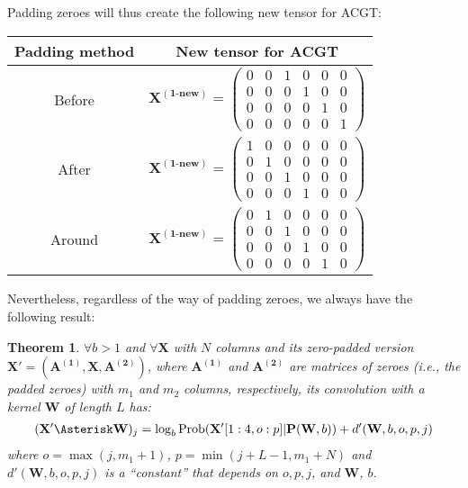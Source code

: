 \documentclass[12pt]{article}
\newcommand{\matrixSymbol}[1]{\mathbf{#1}}
\newtheorem{theorem}{Theorem}
\begin{document}
Padding zeroes will thus create the following new tensor for ACGT:

\begin{center}
\begin{tabular}{ c  c  }
  \hline
  Padding method & New tensor for ACGT \\
  \hline			
  Before & $ \matrixSymbol{X^{(1\text{-new})}} = \left( \begin{array}{cccccc} 0 & 0 & 1 & 0 & 0 & 0 \\    0 & 0 & 0 & 1 & 0 & 0 \\   0 & 0 & 0 & 0 & 1 & 0 \\   0 & 0 & 0 & 0 & 0 & 1  \end{array} \right)  $ \\
  After & $ \matrixSymbol{X^{(1\text{-new})}} = \left( \begin{array}{cccccc} 1 & 0 & 0 & 0 & 0 & 0 \\   0 & 1 & 0 & 0 & 0 & 0 \\  0 & 0 & 1 & 0 & 0 & 0 \\   0 & 0 & 0 & 1 & 0 & 0  \end{array} \right)  $ \\
  Around & $ \matrixSymbol{X^{(1\text{-new})}} = \left( \begin{array}{cccccc} 0 & 1 & 0 & 0 & 0 & 0 \\    0 & 0 & 1 & 0 & 0 & 0 \\   0 & 0 & 0 & 1 & 0 & 0 \\   0 & 0 & 0 & 0 & 1 & 0  \end{array} \right)  $ \\
  \hline  
\end{tabular}
\end{center}

Nevertheless, regardless of the way of padding zeroes, we always have the following result:

\begin{theorem}
$\forall b > 1$ and $\forall \matrixSymbol{X}$ with $N$ columns and its zero-padded version $\matrixSymbol{X'} = \left( \matrixSymbol{A^{(1)}}, \matrixSymbol{X}, \matrixSymbol{A^{(2)}}\right)$, where $\matrixSymbol{A^{(1)}}$ and $\matrixSymbol{A^{(2)}}$ are matrices of zeroes (i.e., the padded zeroes) with $m_1$ and $m_2$ columns, respectively, its convolution with a kernel $\matrixSymbol{W}$ of length $L$ has:
\begin{align}
 (\matrixSymbol{X'} \Asterisk \matrixSymbol{W})_j = \log_b{\mathrm{Prob}(\matrixSymbol{X'}[1:4, o:p]|\matrixSymbol{P}(\matrixSymbol{W}, b))} + d'(\matrixSymbol{W}, b, o, p, j)
\end{align}
where $o = \max(j, m_1 + 1)$, $p = \min(j+L-1, m_1 + N)$ and  $d'(\matrixSymbol{W}, b, o, p, j)$ is a ``constant'' that depends on $o, p, j$, and $\matrixSymbol{W}$, $b$.
\end{theorem}
\end{document}
